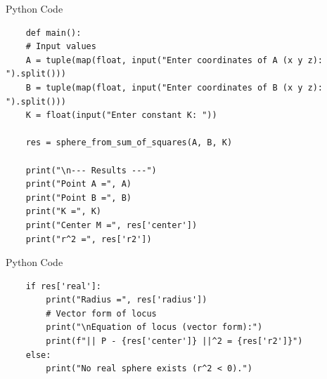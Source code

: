 \documentclass{beamer}
\begin{document}
\begin{frame}[fragile]{Python Code}
    \begin{verbatim}
    def main():
    # Input values
    A = tuple(map(float, input("Enter coordinates of A (x y z): ").split()))
    B = tuple(map(float, input("Enter coordinates of B (x y z): ").split()))
    K = float(input("Enter constant K: "))

    res = sphere_from_sum_of_squares(A, B, K)

    print("\n--- Results ---")
    print("Point A =", A)
    print("Point B =", B)
    print("K =", K)
    print("Center M =", res['center'])
    print("r^2 =", res['r2'])
    \end{verbatim}
\end{frame}

\begin{frame}[fragile]{Python Code}
    \begin{verbatim}
    if res['real']:
        print("Radius =", res['radius'])
        # Vector form of locus
        print("\nEquation of locus (vector form):")
        print(f"|| P - {res['center']} ||^2 = {res['r2']}")
    else:
        print("No real sphere exists (r^2 < 0).")
    \end{verbatim}
\end{frame}
\end{document}
